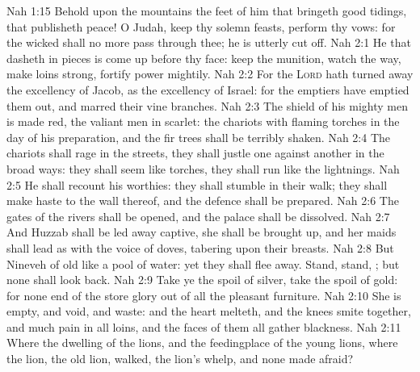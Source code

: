 \vs Nah 1:15 Behold upon the mountains the feet of him that bringeth good tidings, that publisheth peace! O Judah, keep thy solemn feasts, perform thy vows: for the wicked shall no more pass through thee; he is utterly cut off.
\vs Nah 2:1 He that dasheth in pieces is come up before thy face: keep the munition, watch the way, make  loins strong, fortify  power mightily.
\vs Nah 2:2 For the \textsc{Lord} hath turned away the excellency of Jacob, as the excellency of Israel: for the emptiers have emptied them out, and marred their vine branches.
\vs Nah 2:3 The shield of his mighty men is made red, the valiant men  in scarlet: the chariots  with flaming torches in the day of his preparation, and the fir trees shall be terribly shaken.
\vs Nah 2:4 The chariots shall rage in the streets, they shall justle one against another in the broad ways: they shall seem like torches, they shall run like the lightnings.
\vs Nah 2:5 He shall recount his worthies: they shall stumble in their walk; they shall make haste to the wall thereof, and the defence shall be prepared.
\vs Nah 2:6 The gates of the rivers shall be opened, and the palace shall be dissolved.
\vs Nah 2:7 And Huzzab shall be led away captive, she shall be brought up, and her maids shall lead  as with the voice of doves, tabering upon their breasts.
\vs Nah 2:8 But Nineveh  of old like a pool of water: yet they shall flee away. Stand, stand, ; but none shall look back.
\vs Nah 2:9 Take ye the spoil of silver, take the spoil of gold: for  none end of the store  glory out of all the pleasant furniture.
\vs Nah 2:10 She is empty, and void, and waste: and the heart melteth, and the knees smite together, and much pain  in all loins, and the faces of them all gather blackness.
\vs Nah 2:11 Where  the dwelling of the lions, and the feedingplace of the young lions, where the lion,  the old lion, walked,  the lion's whelp, and none made  afraid?
